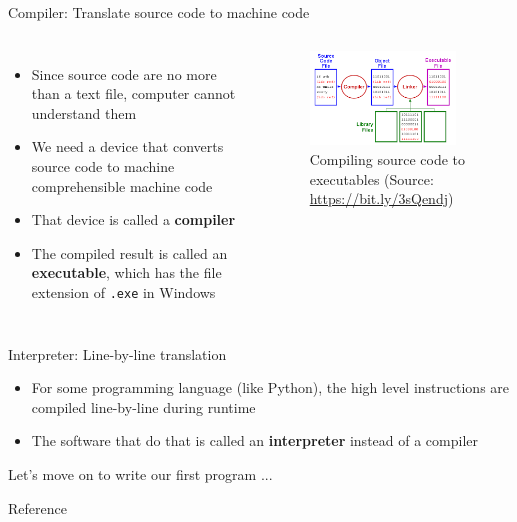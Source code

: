 \documentclass[10pt,xcolor={table,dvipsnames},t]{beamer}
\begin{document}
\begin{frame}{Compiler: Translate source code to machine code}
  \begin{columns}
    \begin{itemize}
      \item Since source code are no more than a text file, computer cannot understand them
      \item We need a device that converts source code to machine comprehensible machine code
      \item That device is called a \textbf{compiler} 
      \item The compiled result is called an \textbf{executable}, which has the file extension of \texttt{.exe} in Windows
    \end{itemize}
  

    \begin{figure}
      \includegraphics[width=0.9\textwidth]{img/compiling.png}
      \caption{Compiling source code to executables (Source: \href{https://bit.ly/3sQendj}{https://bit.ly/3sQendj})}
      \label{fig:compiling}
    \end{figure}
  \end{columns}
  
\end{frame}

\begin{frame}{Interpreter: Line-by-line translation}

  \begin{itemize}
    \item For some programming language (like Python), the high level instructions are compiled line-by-line during runtime
    \item The software that do that is called an \textbf{interpreter} instead of a compiler
  \end{itemize}
  
\end{frame}

\begin{frame}{Let's move on to write our first program ... }
  
\end{frame}
\begin{frame}[allowframebreaks]{Reference}
  \printbibliography
\end{frame}
\end{document}

